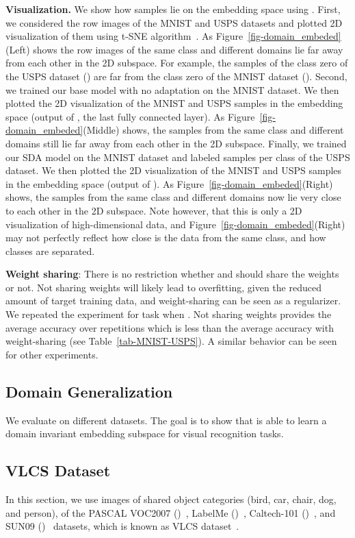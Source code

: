 \noindent \textbf{Visualization.} We show how samples lie on the embedding space using \modelDA. First, we considered the row images of the MNIST and USPS datasets and plotted 2D visualization of them using t-SNE algorithm~\cite{maaten2008visualizing}. As Figure~\ref{fig-domain_embeded}(Left) shows the row images of the same class and different domains lie far away from each other in the 2D subspace. For example, the samples of the class zero of the USPS dataset () are far from the class zero of the MNIST dataset (). Second, we trained our base model with no adaptation on the MNIST dataset. We then plotted the 2D visualization of the MNIST and USPS samples in the embedding space (output of , the last fully connected layer). As Figure~\ref{fig-domain_embeded}(Middle) shows, the samples from the same class and different domains still lie far away from each other in the 2D subspace. Finally, we trained our SDA model on the MNIST dataset and  labeled samples per class of the USPS dataset. We then plotted the 2D visualization of the MNIST and USPS samples in the embedding space (output of ). As Figure~\ref{fig-domain_embeded}(Right) shows, the samples from the same class and different domains now lie very close to each other in the 2D subspace. Note however, that this is only a 2D visualization of high-dimensional data, and Figure~\ref{fig-domain_embeded}(Right) may not perfectly reflect how close is the data from the same class, and how classes are separated.

\noindent \textbf{Weight sharing}: There is no restriction whether  and  should share the weights or not. Not sharing weights will likely lead to overfitting, given the reduced amount of target training data, and weight-sharing can be seen as a regularizer. We repeated the experiment for  task when . Not sharing weights provides the average accuracy  over  repetitions  which is less than the average accuracy with weight-sharing (see Table~\ref{tab-MNIST-USPS}). A similar behavior can be seen for other experiments.

\subsection{Domain Generalization}

We evaluate \modelGA on different datasets. The goal is to show that \modelGA is able to learn a domain invariant embedding subspace for visual recognition tasks.

\subsection{VLCS Dataset}
In this section, we use images of  shared object categories (bird, car, chair, dog, and person), of the PASCAL VOC2007 ()~\cite{everingham2010pascal}, LabelMe ()~\cite{russell2008labelme},
Caltech-101 ()~\cite{fei2007learning}, and SUN09 ()~\cite{choi2010exploiting} datasets, which is known as VLCS dataset~\cite{FXRQ_iccv13}.


